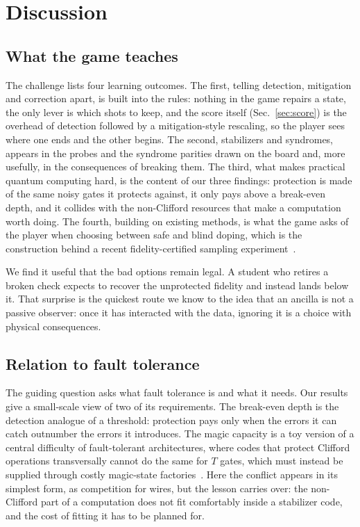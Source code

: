 \section{Discussion}
\label{sec:discussion}

\subsection{What the game teaches}
The challenge lists four learning outcomes. The first, telling detection, mitigation and correction apart, is built into the rules: nothing in the game repairs a state, the only lever is which shots to keep, and the score itself (Sec.~\ref{sec:score}) is the overhead of detection followed by a mitigation-style rescaling, so the player sees where one ends and the other begins. The second, stabilizers and syndromes, appears in the probes and the syndrome parities drawn on the board and, more usefully, in the consequences of breaking them. The third, what makes practical quantum computing hard, is the content of our three findings: protection is made of the same noisy gates it protects against, it only pays above a break-even depth, and it collides with the non-Clifford resources that make a computation worth doing. The fourth, building on existing methods, is what the game asks of the player when choosing between safe and blind doping, which is the construction behind a recent fidelity-certified sampling experiment~\cite{martiel2026sampling}.

We find it useful that the bad options remain legal. A student who retires a broken check expects to recover the unprotected fidelity and instead lands below it. That surprise is the quickest route we know to the idea that an ancilla is not a passive observer: once it has interacted with the data, ignoring it is a choice with physical consequences.

\subsection{Relation to fault tolerance}
The guiding question asks what fault tolerance is and what it needs. Our results give a small-scale view of two of its requirements. The break-even depth is the detection analogue of a threshold: protection pays only when the errors it can catch outnumber the errors it introduces. The magic capacity is a toy version of a central difficulty of fault-tolerant architectures, where codes that protect Clifford operations transversally cannot do the same for $T$ gates, which must instead be supplied through costly magic-state factories~\cite{bravyi2005magic}. Here the conflict appears in its simplest form, as competition for wires, but the lesson carries over: the non-Clifford part of a computation does not fit comfortably inside a stabilizer code, and the cost of fitting it has to be planned for.

